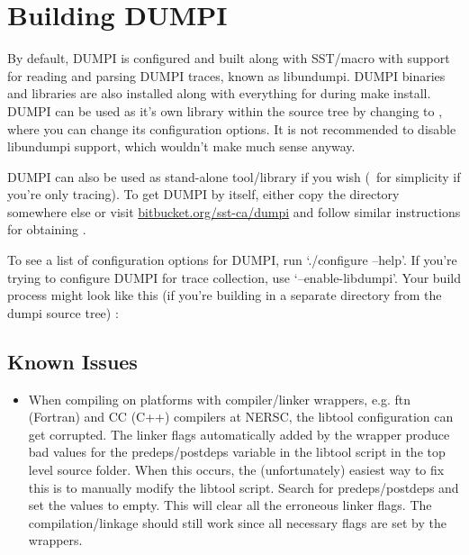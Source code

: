\section{Building DUMPI}
\label{sec:building:dumpi}

By default, DUMPI is configured and built along with SST/macro with support for reading and parsing DUMPI traces, known as libundumpi.  
DUMPI binaries and libraries are also installed along with everything for \sstmacro during make install.   
DUMPI can be used as it's own library within the \sstmacro source tree by changing to , 
where you can change its configuration options.  
It is not recommended to disable libundumpi support, which wouldn't make much sense anyway. 

DUMPI can also be used as stand-alone tool/library if you wish (\eg~for simplicity if you're only tracing). 
To get DUMPI by itself, either copy the  directory somewhere else or visit \url{bitbucket.org/sst-ca/dumpi} 
and follow similar instructions for obtaining \sstmacro.

To see a list of configuration options for DUMPI, run `./configure --help'.  
If you're trying to configure DUMPI for trace collection, use `--enable-libdumpi'.
Your build process might look like this (if you're building in a separate directory from the dumpi source tree) :


\subsection{Known Issues}
\label{subsubsec:building:dumpi:issues}

\begin{itemize}
\item When compiling on platforms with compiler/linker wrappers, e.g. ftn (Fortran) and CC (C++) compilers 
at NERSC, the libtool configuration can get corrupted.  The linker flags automatically added by the 
wrapper produce bad values for the predeps/postdeps variable in the libtool script in the top 
level source folder.  When this occurs, the (unfortunately) easiest way to fix this is to manually modify
the libtool script.  Search for predeps/postdeps and set the values to empty.
This will clear all the erroneous linker flags.  The compilation/linkage should still work since 
all necessary flags are set by the wrappers. 
\end{itemize}

